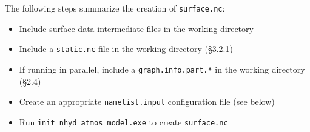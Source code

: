 The following steps summarize the creation of {\tt surface.nc}:

\begin{itemize}
\item Include surface data intermediate files in the working directory
\item Include a {\tt static.nc} file in the working directory (\S 3.2.1)
\item If running in parallel, include a {\tt graph.info.part.*} in the working directory (\S 2.4)
\item Create an appropriate {\tt namelist.input} configuration file (see below)
\item Run {\tt init\_nhyd\_atmos\_model.exe} to create {\tt surface.nc}
\end{itemize}


\begin{longtable}{p{3.0in} |p{3.25in}}


\end{longtable}

